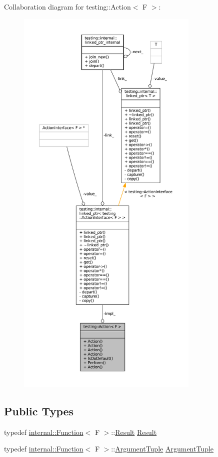 Collaboration diagram for testing\+:\+:Action$<$ F $>$\+:
\nopagebreak
\begin{figure}[H]
\begin{center}
\leavevmode
\includegraphics[height=550pt]{classtesting_1_1Action__coll__graph}
\end{center}
\end{figure}
\subsection*{Public Types}
\begin{DoxyCompactItemize}
\item 
typedef \hyperlink{structtesting_1_1internal_1_1Function}{internal\+::\+Function}$<$ F $>$\+::\hyperlink{classtesting_1_1Action_a9af08a21ad329331fde856cba9b6dea2}{Result} \hyperlink{classtesting_1_1Action_a9af08a21ad329331fde856cba9b6dea2}{Result}
\item 
typedef \hyperlink{structtesting_1_1internal_1_1Function}{internal\+::\+Function}$<$ F $>$\+::\hyperlink{classtesting_1_1Action_ae27fda510696a9294f991de5b1abfaf2}{Argument\+Tuple} \hyperlink{classtesting_1_1Action_ae27fda510696a9294f991de5b1abfaf2}{Argument\+Tuple}
\end{DoxyCompactItemize}
